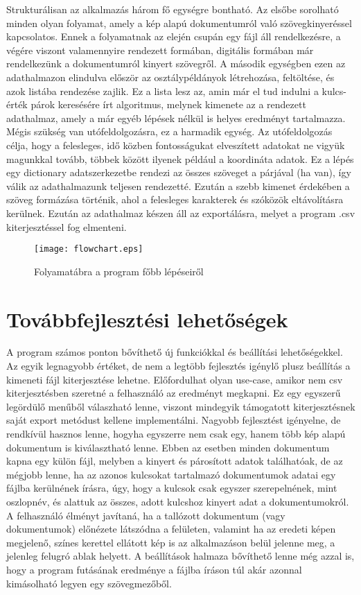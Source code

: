 \documentclass[12pt]{report}
\begin{document}
Strukturálisan az alkalmazás három fő egységre bontható. Az elsőbe sorolható minden olyan folyamat, amely a kép alapú dokumentumról való szövegkinyeréssel kapcsolatos. Ennek a folyamatnak az elején csupán egy fájl áll rendelkezésre, a végére viszont valamennyire rendezett formában, digitális formában már rendelkezünk a dokumentumról kinyert szövegről.
A második egységben ezen az adathalmazon elindulva először az osztálypéldányok létrehozása, feltöltése, és azok listába rendezése zajlik. Ez a lista lesz az, amin már el tud indulni a kulcs-érték párok keresésére írt algoritmus, melynek kimenete az a rendezett adathalmaz, amely a már egyéb lépések nélkül is helyes eredményt tartalmazza.
Mégis szükség van utófeldolgozásra, ez a harmadik egység. Az utófeldolgozás célja, hogy a felesleges, idő közben fontosságukat elveszített adatokat ne vigyük magunkkal tovább, többek között ilyenek például a koordináta adatok. Ez a lépés egy dictionary adatszerkezetbe rendezi az összes szöveget a párjával (ha van), így válik az adathalmazunk teljesen rendezetté. Ezután a szebb kimenet érdekében a szöveg formázása történik, ahol a felesleges karakterek és szóközök eltávolításra kerülnek.
Ezután az adathalmaz készen áll az exportálásra, melyet a program .csv kiterjesztéssel fog elmenteni.

\begin{figure}[h]
    \centerline{\texttt{[image: flowchart.eps]}}
    \caption{Folyamatábra a program főbb lépéseiről}
\end{figure}

\section{Továbbfejlesztési lehetőségek}

A program számos ponton bővíthető új funkciókkal és beállítási lehetőségekkel. Az egyik legnagyobb értéket, de nem a legtöbb fejlesztés igénylő plusz beállítás a kimeneti fájl kiterjesztése lehetne. Előfordulhat olyan use-case, amikor nem csv kiterjesztésben szeretné a felhasználó az eredményt megkapni. Ez egy egyszerű legördülő menűből válaszható lenne, viszont mindegyik támogatott kiterjesztésnek saját export metódust kellene implementálni.
Nagyobb fejlesztést igényelne, de rendkívül hasznos lenne, hogyha egyszerre nem csak egy, hanem több kép alapú dokumentum is kiválasztható lenne. Ebben az esetben minden dokumentum kapna egy külön fájl, melyben a kinyert és párosított adatok találhatóak, de az mégjobb lenne, ha az azonos kulcsokat tartalmazó dokumentumok adatai egy fájlba kerülnének írásra, úgy, hogy a kulcsok csak egyszer szerepelnének, mint oszlopnév, és alattuk az összes, adott kulcshoz kinyert adat a dokumentumokról.
A felhasználó élményt javítaná, ha a tallózott dokumentum (vagy dokumentumok) előnézete látszódna a felületen, valamint ha az eredeti képen megjelenő, színes kerettel ellátott kép is az alkalmazáson belül jelenne meg, a jelenleg felugró ablak helyett. A beállítások halmaza bővíthető lenne még azzal is, hogy a program futásának eredménye a fájlba íráson túl akár azonnal kimásolható legyen egy szövegmezőből.
\end{document}
